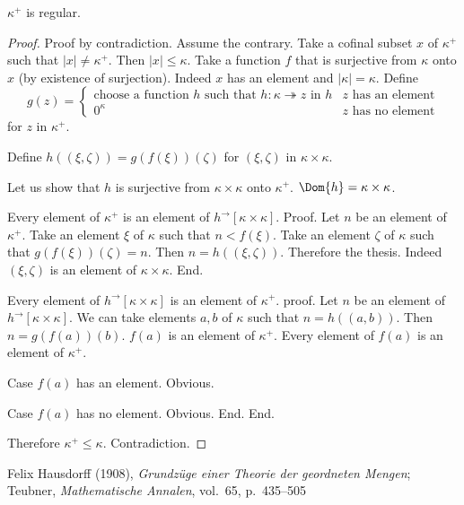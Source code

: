 \documentclass{article}
\newcommand{\Prod}[2]{#1\times #2}
\newcommand{\Succ}[1]{#1^{+}}
\newcommand{\image}[2]{#1^{\to}[#2]}
\newcommand{\card}[1]{\left|#1\right|}
\newcommand{\surjects}{\twoheadrightarrow}
\begin{document}
  \begin{forthel}
    \begin{theorem}[Hausdorff]
      $\Succ{\kappa}$ is regular.
    \end{theorem}
    \begin{proof}
      Proof by contradiction. Assume the contrary.
      Take a cofinal subset $x$ of $\Succ{\kappa}$ such that $\card{x} \neq \Succ{\kappa}$.
      Then $\card{x} \leq \kappa$.
      Take a function $f$ that is surjective from $\kappa$ onto $x$ (by existence of surjection).
      Indeed $x$ has an element and $\card{\kappa} = \kappa$.
      Define
      $$
        g(z) =
          \begin{cases}
            \text{choose a function $h$ such that $h : \kappa \surjects z$ in $h$}
            & \text{$z$ has an element}
            \\
            \text{$0^\kappa$}
            & \text{$z$ has no element}
          \end{cases}
      $$
      for $z$ in $\Succ{\kappa}$.

      Define $h((\xi,\zeta)) = g(f(\xi))(\zeta)$ for $(\xi,\zeta)$ in $\Prod{\kappa}{\kappa}$.

      Let us show that $h$ is surjective from $\Prod{\kappa}{\kappa}$ onto $\Succ{\kappa}$.
      $\Dom{h} = \Prod{\kappa}{\kappa}$.

        Every element of $\Succ{\kappa}$ is an element of $\image{h}{\Prod{\kappa}{\kappa}}$.
        Proof.
          Let $n$ be an element of $\Succ{\kappa}$.
          Take an element $\xi$ of $\kappa$ such that $n < f(\xi)$.
          Take an element $\zeta$ of $\kappa$ such that $g(f(\xi))(\zeta) = n$.
          Then $n = h((\xi,\zeta))$.
          Therefore the thesis.
          Indeed $(\xi,\zeta)$ is an element of $\Prod{\kappa}{\kappa}$.
        End.

        Every element of $\image{h}{\Prod{\kappa}{\kappa}}$ is an element of $\Succ{\kappa}$.
        proof.
          Let $n$ be an element of $\image{h}{\Prod{\kappa}{\kappa}}$.
          We can take elements $a,b$ of $\kappa$ such that $n = h((a,b))$.
          Then $n = g(f(a))(b)$.
          $f(a)$ is an element of $\Succ{\kappa}$.
          Every element of $f(a)$ is an element of $\Succ{\kappa}$.

          Case $f(a)$ has an element. Obvious.

          Case $f(a)$ has no element. Obvious.
        End.
      End.

      Therefore $\Succ{\kappa} \leq \kappa$. Contradiction.
    \end{proof}
  \end{forthel}

\begin{thebibliography}{1}
   Felix Hausdorff (1908),
    \textit{Grundzüge einer Theorie der geordneten Mengen};
    Teubner, \textit{Mathematische Annalen}, vol.~65, p.~435--505
\end{thebibliography}
\end{document}
